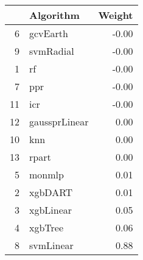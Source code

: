 \begin{table}[ht]
\centering
\begin{tabular}{rlr}
  \hline
 & Algorithm & Weight \\ 
  \hline
6 & gcvEarth & -0.00 \\ 
  9 & svmRadial & -0.00 \\ 
  1 & rf & -0.00 \\ 
  7 & ppr & -0.00 \\ 
  11 & icr & -0.00 \\ 
  12 & gaussprLinear & 0.00 \\ 
  10 & knn & 0.00 \\ 
  13 & rpart & 0.00 \\ 
  5 & monmlp & 0.01 \\ 
  2 & xgbDART & 0.01 \\ 
  3 & xgbLinear & 0.05 \\ 
  4 & xgbTree & 0.06 \\ 
  8 & svmLinear & 0.88 \\ 
   \hline
\end{tabular}
\end{table}
